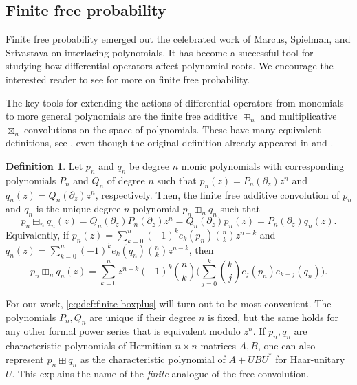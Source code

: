 \documentclass[reqno]{amsart}
\newcommand{\1}{\mathbf{1}}
\theoremstyle{plain}
\theoremstyle{definition}
\newtheorem{definition}[theorem]{Definition}
\theoremstyle{remark}
\numberwithin{equation}{section}
\begin{document}
\subsection{Finite free probability}\label{sec:finite_free_probability}  Finite free probability emerged out the celebrated work of Marcus, Spielman, and Srivastava \cite{Marcus-Spielman-Srivastava2015-1,Marcus-Spielman-Srivastava2015-2,Marcus-Spielman-Srivastava2022} on interlacing polynomials. It has become a successful tool for studying how differential operators affect polynomial roots. We encourage the interested reader to see \cite{Arizmendi-Perales2018,Marcus-Spielman-Srivastava2022, Jalowy-Kabluchko-Marynych2025} for more on finite free probability. 

The key tools for extending the actions of differential operators from monomials to more general polynomials are the finite free additive $\boxplus_{n}$ and multiplicative $\boxtimes_{n}$ convolutions on the space of polynomials. These have many equivalent definitions, see \cite[\S 1.1]{Marcus-Spielman-Srivastava2022}, even though the original definition already appeared in \cite{walsh} and \cite{szegoe_bemerkungen_grace}.  \begin{definition}\label{def:finite boxplus}
	Let $p_n$ and $q_n$ be degree $n$ monic polynomials with corresponding polynomials  $P_n$ and $Q_{n}$ of degree $n$ such that $p_n(z)=P_n(\partial_{z})z^{n}$ and $q_{n}(z)=Q_n(\partial_{z})z^n$, respectively.  %
	Then, the finite free additive convolution  of $p_n$ and $q_n$ is the unique degree $n$ polynomial $p_n\boxplus_{n}q_n$ such that \begin{equation}\label{eq:def:finite boxplus}
		p_n\boxplus_{n}q_{n}(z)=Q_n(\partial_{z})P_n(\partial_{z})z^n=Q_{n}(\partial_{z})p_n(z)=P_{n}(\partial_z)q_n(z).
	\end{equation}
	Equivalently, if $p_n(z)=\sum_{k=0}^{n}(-1)^{k}e_{k}(p_n)\binom{n}{k}z^{n-k}$ and $q_n(z)=\sum_{k=0}^{n}(-1)^{k}e_{k}(q_n)\binom{n}{k}z^{n-k}$, then \begin{equation*}
		p_n\boxplus_{n}q_n(z)=\sum_{k=0}^{n}z^{n-k}(-1)^{k}\binom{n}{k}\Bigg(\sum_{j=0}^k\binom k j  e_{j}(p_n)e_{k-j}(q_n)\Bigg) . 
	\end{equation*}
\end{definition}

 For our work, \eqref{eq:def:finite boxplus} will turn out to be most convenient. The polynomials $P_n,Q_n$ are unique if their degree $n$ is fixed, but the same holds for any other formal power series that is equivalent modulo $z^n$.
If $p_n,q_n$ are characteristic polynomials of Hermitian $n\times n$ matrices $A,B$, one can also represent $p_n\boxplus q_n$ as the characteristic polynomial of $A+UBU^*$ for Haar-unitary $U$. This explains the name of the \emph{finite} analogue of the free convolution.
\end{document}
